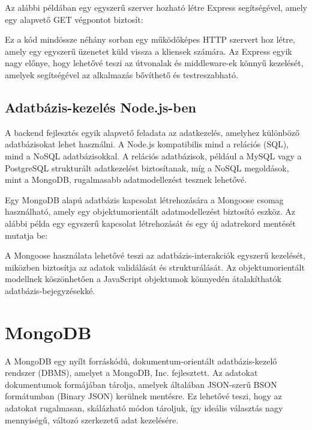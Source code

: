 \documentclass[
]{thesis-ekf}
\theoremstyle{definition}
\theoremstyle{remark}
\begin{document}
Az alábbi példában egy egyszerű szerver hozható létre Express segítségével, amely egy alapvető GET végpontot biztosít:

%

Ez a kód mindössze néhány sorban egy működőképes HTTP szervert hoz létre, amely egy egyszerű üzenetet küld vissza a kliensek számára. Az Express egyik nagy előnye, hogy lehetővé teszi az útvonalak és middleware-ek könnyű kezelését, amelyek segítségével az alkalmazás bővíthető és testreszabható.

\subsection{Adatbázis-kezelés Node.js-ben}

A backend fejlesztés egyik alapvető feladata az adatkezelés, amelyhez különböző adatbázisokat lehet használni. A Node.js kompatibilis mind a relációs (SQL), mind a NoSQL adatbázisokkal. A relációs adatbázisok, például a MySQL vagy a PostgreSQL strukturált adatkezelést biztosítanak, míg a NoSQL megoldások, mint a MongoDB, rugalmasabb adatmodellezést tesznek lehetővé.

Egy MongoDB alapú adatbázis kapcsolat létrehozására a Mongoose csomag használható, amely egy objektumorientált adatmodellezést biztosító eszköz. Az alábbi példa egy egyszerű kapcsolat létrehozását és egy új adatrekord mentését mutatja be:

%

A Mongoose használata lehetővé teszi az adatbázis-interakciók egyszerű kezelését, miközben biztosítja az adatok validálását és strukturálását. Az objektumorientált modellnek köszönhetően a JavaScript objektumok könnyedén átalakíthatók adatbázis-bejegyzésekké.

\section{MongoDB}

A MongoDB egy nyílt forráskódú, dokumentum-orientált adatbázis-kezelő rendszer (DBMS), amelyet a MongoDB, Inc. fejlesztett. Az adatokat dokumentumok formájában tárolja, amelyek általában JSON-szerű BSON formátumban (Binary JSON) kerülnek mentésre. Ez lehetővé teszi, hogy az adatokat rugalmasan, skálázható módon tároljuk, így ideális választás nagy mennyiségű, változó szerkezetű adat kezelésére.
\end{document}
